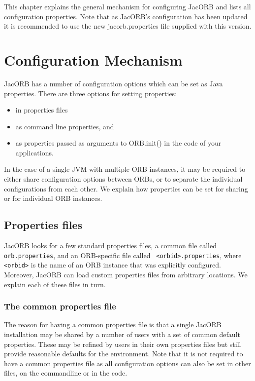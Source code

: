 ﻿%
%

This chapter explains the general mechanism for configuring JacORB
and lists all configuration properties. Note that as JacORB's
configuration has been updated it is recommended to use the new
jacorb.properties file supplied with this version.

\section{Configuration Mechanism}

JacORB has a number of configuration options which can be set as Java
properties. There are three options for setting properties:

\begin{itemize}
\item in properties files
\item as command line properties, and
\item as properties passed as arguments to ORB.init() in the code of your
  applications.
\end{itemize}

In the case of a single JVM with multiple ORB instances, it may be
required to either share configuration options between ORBs, or to
separate the individual configurations from each other. We explain how
properties can be set for sharing or for individual ORB instances.

\subsection{Properties files}

JacORB looks for a few standard properties files, a common file called
{\tt orb.properties}, and an ORB-specific file called {\tt
  <orbid>.properties}, where {\tt <orbid>} is the name of an ORB
instance that was explicitly configured. Moreover, JacORB can load
custom properties files from arbitrary locations. We explain each of
these files in turn.

\subsubsection{The common properties file}

The reason for having a common properties file is that a single JacORB
installation may be shared by a number of users with a set of common
default properties. These may be refined by users in their own
properties files but still provide reasonable defaults for the
environment. Note that it is not required to have a common properties
file as all configuration options can also be set in other files, on
the commandline or in the code.

